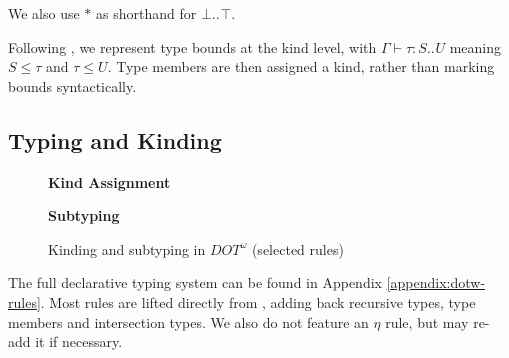 \documentclass[a4paper, 10pt]{article}
\newcommand{\DOTw}{\ensuremath{DOT^\omega}}
\newcommand{\interval}[3][]{#2 .._{#1} #3}
\newcommand{\iskd}[1]{#1\ \texttt{kd}}
\newcommand{\TyKd}{*}
\newcommand{\KDepArr}[3]{\Pi(#1:#2).#3}
\newcommand{\subst}[3]{#1[#2/#3]}
\newcommand{\objtyp}[3]{\{ \textbf{#1}\ #2 : #3 \}}
\begin{document}
We also use $*$ as shorthand for $\interval{\bot}{\top}$.

Following \citet{stucki2017}, we represent type bounds at the kind level, with
$\Gamma \vdash \tau : \interval{S}{U}$ meaning $S \le \tau$ and $\tau \le U$.
Type members are then assigned a kind, rather than marking bounds
syntactically.

\subsection{Typing and Kinding}

\begin{figure}[ht]
  \textbf{Kind Assignment}
  \textbf{Subtyping}
  \caption{Kinding and subtyping in $\DOTw{}$ (selected rules)}
\end{figure}

The full declarative typing system can be found in Appendix
\ref{appendix:dotw-rules}. Most rules are lifted directly from
\citet{stucki2017}, adding back recursive types, type members and
intersection types. We also do not feature an $\eta$ rule, but may re-add it if
necessary.
\end{document}
